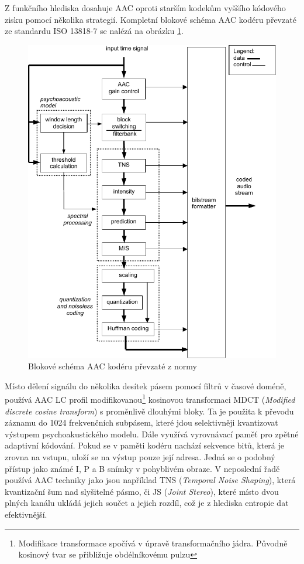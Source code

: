 Z funkčního hlediska dosahuje AAC oproti starším kodekům vyššího kódového zisku pomocí několika strategií. Kompletní blokové schéma AAC kodéru převzaté ze standardu ISO 13818-7 \cite{iso:aac} se nalézá na obrázku \ref{pic:aaclc}.

\begin{figure}[h]
    \centering
    \includegraphics[width=.7\textwidth]{pic/aaclc.pdf}
    \caption{Blokové schéma AAC kodéru převzaté z normy \cite{iso:aac}}
    \label{pic:aaclc}
\end{figure}

Místo dělení signálu do několika desítek pásem pomocí filtrů v časové doméně, používá AAC LC profil modifikovanou\footnote{Modifikace transformace spočívá v úpravě transformačního jádra. Původně kosinový tvar se přibližuje obdélníkovému pulzu} kosinovou transformaci MDCT (\textit{Modified discrete cosine transform}) s proměnlivě dlouhými bloky. Ta je použita k převodu záznamu do 1024 frekvenčních subpásem, které jdou selektivněji kvantizovat výstupem psychoakustického modelu. Dále využívá vyrovnávací paměť pro zpětné adaptivní kódování. Pokud se v paměti kodéru nachází sekvence bitů, která je zrovna na vstupu, uloží se na výstup pouze její adresa. Jedná se o podobný přístup jako známé I, P a B snímky v pohyblivém obraze. V neposlední řadě používá AAC techniky jako jsou například TNS (\textit{Temporal Noise Shaping}), která  kvantizační šum nad slyšitelné pásmo, či JS (\textit{Joint Stereo}), které místo dvou plných kanálu ukládá jejich součet a jejich rozdíl, což je z hlediska entropie dat efektivnější.

